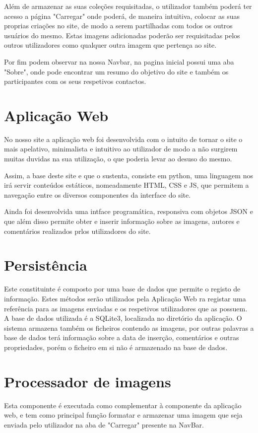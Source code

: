 \documentclass{report}
\begin{document}
Além de armazenar as suas coleções requisitadas, o utilizador também poderá ter acesso a página "Carregar" onde poderá, de maneira intuitiva, colocar as suas proprias criações no site, de modo a serem partilhadas com todos os outros usuários do mesmo. Estas imagens adicionadas poderão ser requisitadas pelos outros utilizadores como qualquer outra imagem que pertença ao site.

Por fim podem observar na nossa Navbar, na pagina inicial possui uma aba "Sobre", onde pode encontrar um resumo do objetivo do site e também os participantes com os seus respetivos contactos. 


\section{Aplicação Web}
No nosso site a aplicação web foi desenvolvida com o intuito de tornar o site o mais apelativo, minimalista e intuitivo ao utilizador de modo a não surgirem muitas duvidas na sua utilização, o que poderia levar ao desuso do mesmo. 

Assim, a base deste site e que o sustenta, consiste em python, uma linguagem nos irá servir conteúdos estáticos, nomeadamente HTML, CSS e JS, que permitem a navegação entre os diversos componentes da interface do site.

Ainda foi desenvolvida uma intface programática, responsiva com objetos JSON e que além disso permite obter e inserir informação sobre as imagens, autores e comentários realizados prlos utilizadores do site.



\section{Persistência}
Este constituinte é composto por uma base de dados que permite o registo de informação. Estes métodos serão utilizados pela Aplicação Web ra registar uma referência para as imagens enviadas e
os respetivos utilizadores que as possuem. A base de dados utilizada é a SQLite3, localizada no diretório da aplicação. O sistema armazena também  os ficheiros contendo as imagens, por outras palavras a base de dados terá informação sobre a data de inserção, comentários e outras propriedades, porém o ficheiro em si não é armazenado na base de dados.


\section{Processador de imagens}
Esta componente é executada como complementar à componente da aplicação web, e tem como principal função formatar e armazenar uma imagem que seja enviada pelo utilizador na aba de "Carregar" presente na NavBar.
\end{document}
